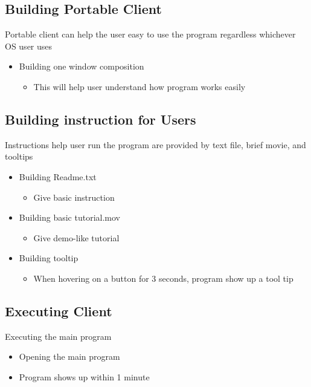 \documentclass[conference]{IEEEtran}
\begin{document}
\subsection{Building Portable Client}
 Portable client can help the user easy to use the program regardless whichever OS user uses

\begin{itemize}
  \item Building one window composition
  \begin{itemize}
    \item This will help user understand how program works easily
  \end{itemize}
\end{itemize}
\textit{ }


\subsection{Building instruction for Users}
 Instructions help user run the program are provided by text file, brief movie, and tooltips

\begin{itemize}
  \item Building Readme.txt
  \begin{itemize}
    \item Give basic instruction
  \end{itemize}
  \item Building basic tutorial.mov
  \begin{itemize}
    \item Give demo-like tutorial
  \end{itemize}
  \item Building tooltip
  \begin{itemize}
    \item When hovering on a button for 3 seconds, program show up a tool tip
  \end{itemize}
\end{itemize}
\textit{ }


\subsection{Executing Client}
 Executing the main program 

\begin{itemize}
  \item Opening the main program
  \item Program shows up within 1 minute
\end{itemize}
\textit{ }
\end{document}
